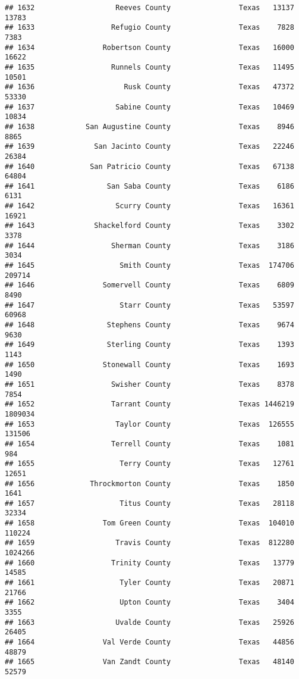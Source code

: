 \documentclass[
]{article}
\begin{document}
\begin{verbatim}
## 1632                   Reeves County                Texas   13137   13783
## 1633                  Refugio County                Texas    7828    7383
## 1634                Robertson County                Texas   16000   16622
## 1635                  Runnels County                Texas   11495   10501
## 1636                     Rusk County                Texas   47372   53330
## 1637                   Sabine County                Texas   10469   10834
## 1638            San Augustine County                Texas    8946    8865
## 1639              San Jacinto County                Texas   22246   26384
## 1640             San Patricio County                Texas   67138   64804
## 1641                 San Saba County                Texas    6186    6131
## 1642                   Scurry County                Texas   16361   16921
## 1643              Shackelford County                Texas    3302    3378
## 1644                  Sherman County                Texas    3186    3034
## 1645                    Smith County                Texas  174706  209714
## 1646                Somervell County                Texas    6809    8490
## 1647                    Starr County                Texas   53597   60968
## 1648                 Stephens County                Texas    9674    9630
## 1649                 Sterling County                Texas    1393    1143
## 1650                Stonewall County                Texas    1693    1490
## 1651                  Swisher County                Texas    8378    7854
## 1652                  Tarrant County                Texas 1446219 1809034
## 1653                   Taylor County                Texas  126555  131506
## 1654                  Terrell County                Texas    1081     984
## 1655                    Terry County                Texas   12761   12651
## 1656             Throckmorton County                Texas    1850    1641
## 1657                    Titus County                Texas   28118   32334
## 1658                Tom Green County                Texas  104010  110224
## 1659                   Travis County                Texas  812280 1024266
## 1660                  Trinity County                Texas   13779   14585
## 1661                    Tyler County                Texas   20871   21766
## 1662                    Upton County                Texas    3404    3355
## 1663                   Uvalde County                Texas   25926   26405
## 1664                Val Verde County                Texas   44856   48879
## 1665                Van Zandt County                Texas   48140   52579

\end{verbatim}
\end{document}
